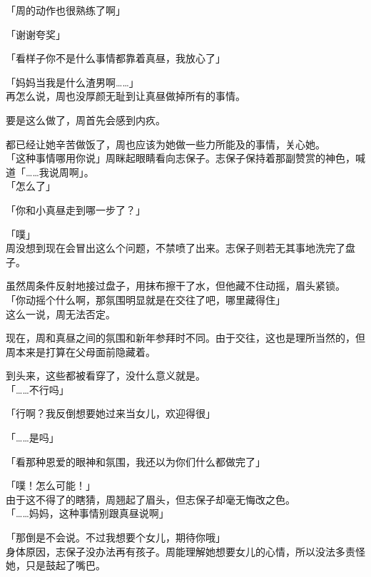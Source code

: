 「周的动作也很熟练了啊」

「谢谢夸奖」

「看样子你不是什么事情都靠着真昼，我放心了」

「妈妈当我是什么渣男啊……」\\

再怎么说，周也没厚颜无耻到让真昼做掉所有的事情。

要是这么做了，周首先会感到内疚。

都已经让她辛苦做饭了，周也应该为她做一些力所能及的事情，关心她。\\

「这种事情哪用你说」周眯起眼睛看向志保子。志保子保持着那副赞赏的神色，喊道「……我说周啊」。\\

「怎么了」

「你和小真昼走到哪一步了？」

「噗」\\

周没想到现在会冒出这么个问题，不禁喷了出来。志保子则若无其事地洗完了盘子。

虽然周条件反射地接过盘子，用抹布擦干了水，但他藏不住动摇，眉头紧锁。\\

「你动摇个什么啊，那氛围明显就是在交往了吧，哪里藏得住」\\

这么一说，周无法否定。

现在，周和真昼之间的氛围和新年参拜时不同。由于交往，这也是理所当然的，但周本来是打算在父母面前隐藏着。

到头来，这些都被看穿了，没什么意义就是。\\

「……不行吗」

「行啊？我反倒想要她过来当女儿，欢迎得很」

「……是吗」

「看那种恩爱的眼神和氛围，我还以为你们什么都做完了」

「噗！怎么可能！」\\

由于这不得了的瞎猜，周翘起了眉头，但志保子却毫无悔改之色。\\

「……妈妈，这种事情别跟真昼说啊」

「那倒是不会说。不过我想要个女儿，期待你哦」\\

身体原因，志保子没办法再有孩子。周能理解她想要女儿的心情，所以没法多责怪她，只是鼓起了嘴巴。\\

